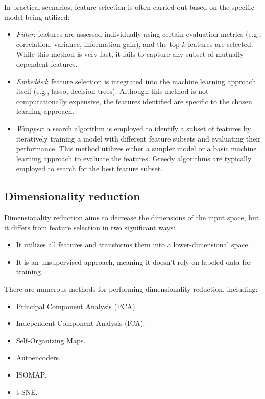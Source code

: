 In practical scenarios, feature selection is often carried out based on the specific model being utilized:
\begin{itemize}
    \item \textit{Filter}: features are assessed individually using certain evaluation metrics (e.g., correlation, variance, information gain), and the top $k$ features are selected. 
        While this method is very fast, it fails to capture any subset of mutually dependent features.
    \item \textit{Embedded}: feature selection is integrated into the machine learning approach itself (e.g., lasso, decision trees).
        Although this method is not computationally expensive, the features identified are specific to the chosen learning approach.
    \item \textit{Wrapper}: a search algorithm is employed to identify a subset of features by iteratively training a model with different feature subsets and evaluating their performance. 
        This method utilizes either a simpler model or a basic machine learning approach to evaluate the features. 
        Greedy algorithms are typically employed to search for the best feature subset.
\end{itemize}

\subsection{Dimensionality reduction}
Dimensionality reduction aims to decrease the dimensions of the input space, but it differs from feature selection in two significant ways:
\begin{itemize}
    \item It utilizes all features and transforms them into a lower-dimensional space.
    \item It is an unsupervised approach, meaning it doesn't rely on labeled data for training.
\end{itemize}
There are numerous methods for performing dimensionality reduction, including:
\begin{itemize}
    \item Principal Component Analysis (PCA).
    \item Independent Component Analysis (ICA).
    \item Self-Organizing Maps.
    \item Autoencoders.
    \item ISOMAP.
    \item t-SNE.
\end{itemize}